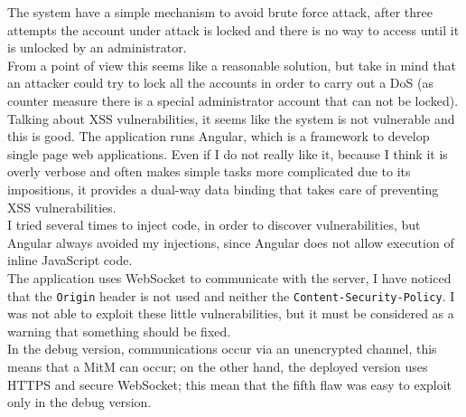 The system have a simple mechanism to avoid brute force attack, after three attempts the account under attack is locked and there is no way to access
until it is unlocked by an administrator.\\
From a point of view this seems like a reasonable solution, but take in mind that an attacker could try to lock all the accounts in order to carry out
a DoS (as counter measure there is a special administrator account that can not be locked).\\
Talking about XSS vulnerabilities, it seems like the system is not vulnerable and this is good. The application runs Angular, which is a
framework to develop single page web applications. Even if I do not really like it, because I think it is overly verbose and often makes simple tasks more complicated due to its impositions, it provides a dual-way data binding that takes care of preventing XSS vulnerabilities.\\
I tried several times to inject code, in order to discover vulnerabilities, but Angular always avoided my injections, since Angular
does not allow execution of inline JavaScript code.\\

The application uses WebSocket to communicate with the server, I have noticed that the \texttt{Origin} header is not used and neither the \texttt{Content-Security-Policy}. I was not able to exploit these little vulnerabilities, but it must be considered as a warning that something
should be fixed.\\
In the debug version, communications occur via an unencrypted channel, this means that a MitM can occur; on the other hand,
the deployed version uses HTTPS and secure WebSocket; this mean that the fifth flaw was easy to exploit only in the debug version.

